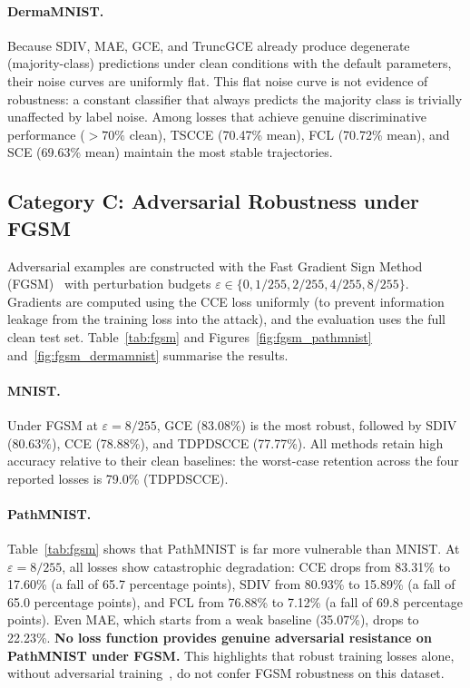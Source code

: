 \paragraph{DermaMNIST.}
Because SDIV, MAE, GCE, and TruncGCE already produce degenerate
(majority-class) predictions under clean conditions with the default
parameters, their noise curves are uniformly flat.
This flat noise curve is not evidence of robustness: a constant classifier
that always predicts the majority class is trivially unaffected by label
noise.
Among losses that achieve genuine discriminative performance ($>70\%$ clean),
TSCCE (70.47\% mean), FCL (70.72\% mean), and SCE (69.63\% mean) maintain
the most stable trajectories.

\subsection{Category C: Adversarial Robustness under FGSM}
\label{sec:fgsm}

Adversarial examples are constructed with the Fast Gradient Sign Method
(FGSM)~\citep{goodfellow2015} with perturbation budgets
$\varepsilon \in \{0, 1/255, 2/255, 4/255, 8/255\}$.
Gradients are computed using the CCE loss uniformly (to prevent information
leakage from the training loss into the attack),
and the evaluation uses the full clean test set.
Table~\ref{tab:fgsm} and Figures~\ref{fig:fgsm_pathmnist} and~\ref{fig:fgsm_dermamnist}
summarise the results.

\paragraph{MNIST.}
Under FGSM at $\varepsilon{=}8/255$, GCE (83.08\%) is the most robust,
followed by SDIV (80.63\%), CCE (78.88\%), and TDPDSCCE (77.77\%).
All methods retain high accuracy relative to their clean baselines:
the worst-case retention across the four reported losses is 79.0\% (TDPDSCCE).

\paragraph{PathMNIST.}
Table~\ref{tab:fgsm} shows that PathMNIST is far more vulnerable than MNIST.
At $\varepsilon{=}8/255$, all losses show catastrophic degradation:
CCE drops from 83.31\% to 17.60\% (a fall of 65.7 percentage points),
SDIV from 80.93\% to 15.89\% (a fall of 65.0 percentage points), and
FCL from 76.88\% to 7.12\% (a fall of 69.8 percentage points).
Even MAE, which starts from a weak baseline (35.07\%), drops to 22.23\%.
\textbf{No loss function provides genuine adversarial resistance on PathMNIST
under FGSM.}
This highlights that robust training losses alone, without adversarial
training~\citep{madry2018pgd}, do not confer FGSM robustness on this dataset.

